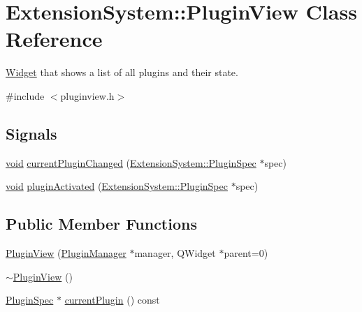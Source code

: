\hypertarget{class_extension_system_1_1_plugin_view}{\section{\-Extension\-System\-:\-:\-Plugin\-View \-Class \-Reference}
\label{class_extension_system_1_1_plugin_view}
}


\hyperlink{class_widget}{\-Widget} that shows a list of all plugins and their state.  




{\ttfamily \#include $<$pluginview.\-h$>$}

\subsection*{\-Signals}
\begin{DoxyCompactItemize}
\item 
\hyperlink{group___u_a_v_objects_plugin_ga444cf2ff3f0ecbe028adce838d373f5c}{void} \hyperlink{class_extension_system_1_1_plugin_view_acb8afbec2c244b6c5225a576e86c3c01}{current\-Plugin\-Changed} (\hyperlink{class_extension_system_1_1_plugin_spec}{\-Extension\-System\-::\-Plugin\-Spec} $\ast$spec)
\item 
\hyperlink{group___u_a_v_objects_plugin_ga444cf2ff3f0ecbe028adce838d373f5c}{void} \hyperlink{class_extension_system_1_1_plugin_view_a0455a1c8215732176c5555d88517f5e5}{plugin\-Activated} (\hyperlink{class_extension_system_1_1_plugin_spec}{\-Extension\-System\-::\-Plugin\-Spec} $\ast$spec)
\end{DoxyCompactItemize}
\subsection*{\-Public \-Member \-Functions}
\begin{DoxyCompactItemize}
\item 
\hyperlink{class_extension_system_1_1_plugin_view_afaa4ceb9c0931e0bcb90508176381016}{\-Plugin\-View} (\hyperlink{class_extension_system_1_1_plugin_manager}{\-Plugin\-Manager} $\ast$manager, \-Q\-Widget $\ast$parent=0)
\item 
\hyperlink{class_extension_system_1_1_plugin_view_adb39058a5108137ed5347791914f0f64}{$\sim$\-Plugin\-View} ()
\item 
\hyperlink{class_extension_system_1_1_plugin_spec}{\-Plugin\-Spec} $\ast$ \hyperlink{class_extension_system_1_1_plugin_view_a2b442b927989161117846bd89b4e0809}{current\-Plugin} () const 
\end{DoxyCompactItemize}


